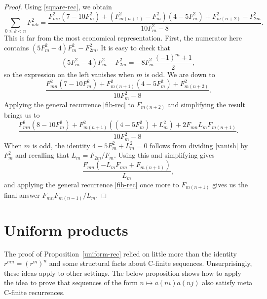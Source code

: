 \documentclass[12pt]{article}
\begin{document}
\begin{proof}
    Using \eqref{square-rec}, we obtain
    \begin{equation*}
        \sum_{0 \leq k < n} F_{mk}^2
        =
        \frac{F_{mn}^2 (7 - 10 F_m^2) + (F_{m(n + 1)}^2 - F_m^2) (4 - 5 F_m^2) + F_{m(n + 2)}^2 - F_{2m}^2}{10 F_m^2 - 8}.
    \end{equation*}
    This is far from the most economical representation. First, the numerator
    here contains $(5 F_m^2 - 4) F_m^2 - F_{2m}^2$. It is easy to check that
    \begin{equation}
        \label{vanish}
        (5 F_m^2 - 4) F_m^2 - F_{2m}^2 = -8 F_m^2 \frac{(-1)^m + 1}{2},
    \end{equation}
    so the expression on the left vanishes when $m$ is odd. We are down to
    \begin{equation*}
        \frac{F_{mn}^2 (7 - 10 F_m^2) + F_{m(n + 1)}^2 (4 - 5 F_m^2) + F_{m(n + 2)}^2}{10 F_m^2 - 8}.
    \end{equation*}
    Applying the general recurrence \eqref{fib-rec} to $F_{m(n + 2)}$ and
    simplifying the result brings us to
    \begin{equation*}
        \frac{F_{mn}^2 (8 - 10 F_m^2) + F_{m(n + 1)}^2 ((4 - 5 F_m^2) + L_m^2) + 2 F_{mn} L_m F_{m(n + 1)}}{10 F_m^2 - 8}.
    \end{equation*}
    When $m$ is odd, the identity $4 - 5 F_m^2 + L_m^2 = 0$ follows from
    dividing \eqref{vanish} by $F_m^2$ and recalling that $L_m = F_{2m} / F_m$.
    Using this and simplifying gives
    \begin{equation*}
        \frac{F_{mn} (-L_m F_{mn} + F_{m(n + 1)})}{L_m},
    \end{equation*}
    and applying the general recurrence \eqref{fib-rec} once more to $F_{m(n +
    1)}$ gives us the final answer $F_{mn} F_{m(n - 1)} / L_m$.
\end{proof}

\section{Uniform products}%
\label{sec:uniform_products}

The proof of Proposition~\ref{uniform-rec} relied on little more than the
identity $r^{mn} = (r^m)^n$ and some structural facts about C-finite sequences.
Unsurprisingly, these ideas apply to other settings. The below proposition
shows how to apply the idea to prove that sequences of the form $n \mapsto
a(ni) a(nj)$ also satisfy meta C-finite recurrences.
\end{document}
